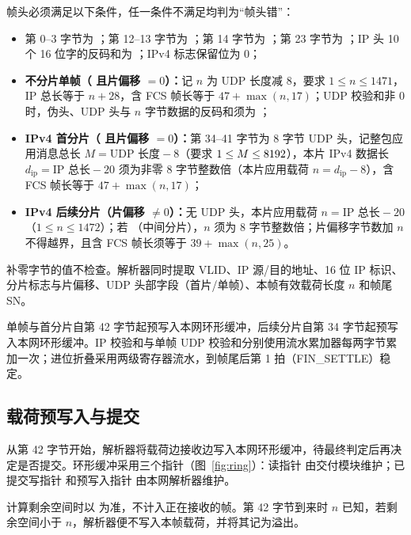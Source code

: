 帧头必须满足以下条件，任一条件不满足均判为“帧头错”：
\begin{itemize}
  \item 第 0--3 字节为 ；第 12--13 字节为 ；第 14 字节为 ；第 23 字节为 ；IP 头 10 个 16 位字的反码和为 ；IPv4 标志保留位为 0；
  \item \textbf{不分片单帧（ 且片偏移 $=0$）：}记 $n$ 为 UDP 长度减 8，要求 $1\le n\le 1471$，IP 总长等于 $n+28$，含 FCS 帧长等于 $47+\max(n,17)$；UDP 校验和非 0 时，伪头、UDP 头与 $n$ 字节数据的反码和须为 ；
  \item \textbf{IPv4 首分片（ 且片偏移 $=0$）：}第 34--41 字节为 8 字节 UDP 头，记整包应用消息总长 $M = \text{UDP 长度}-8$（要求 $1\le M\le 8192$），本片 IPv4 数据长 $d_\text{ip} = \text{IP 总长}-20$ 须为非零 8 字节整数倍（本片应用载荷 $n = d_\text{ip}-8$），含 FCS 帧长等于 $47+\max(n,17)$；
  \item \textbf{IPv4 后续分片（片偏移 $\ne 0$）：}无 UDP 头，本片应用载荷 $n = \text{IP 总长}-20$（$1\le n\le 1472$）；若 （中间分片），$n$ 须为 8 字节整数倍；片偏移字节数加 $n$ 不得越界，且含 FCS 帧长须等于 $39+\max(n,25)$。
\end{itemize}
补零字节的值不检查。解析器同时提取 VLID、IP 源/目的地址、16 位 IP 标识、分片标志与片偏移、UDP 头部字段（首片/单帧）、本帧有效载荷长度 $n$ 和帧尾 SN。

单帧与首分片自第 42 字节起预写入本网环形缓冲，后续分片自第 34 字节起预写入本网环形缓冲。IP 校验和与单帧 UDP 校验和分别使用流水累加器每两字节累加一次；进位折叠采用两级寄存器流水，到帧尾后第 1 拍（FIN\_SETTLE）稳定。

\subsection{载荷预写入与提交}

从第 42 字节开始，解析器将载荷边接收边写入本网环形缓冲，待最终判定后再决定是否提交。环形缓冲采用三个指针（图~\ref{fig:ring}）：读指针  由交付模块维护；已提交写指针  和预写入指针  由本网解析器维护。

计算剩余空间时以  为准，不计入正在接收的帧。第 42 字节到来时 $n$ 已知，若剩余空间小于 $n$，解析器便不写入本帧载荷，并将其记为溢出。


